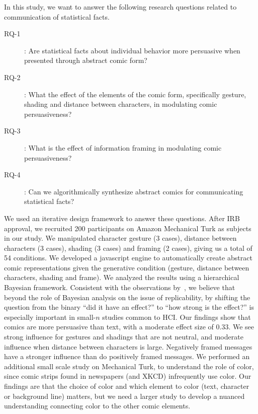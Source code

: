 

In this study, we want to answer the following research questions related to communication of statistical facts.

\begin{description}
 \item[RQ-1]: Are statistical facts about individual behavior more persuasive when presented through abstract comic form?
 \item [RQ-2]: What the effect of the elements of the comic form, specifically gesture, shading and distance between characters, in modulating comic persuasiveness?
 \item [RQ-3]: What is the effect of information framing in modulating comic persuasiveness?
 \item [RQ-4]: Can we algorithmically synthesize abstract comics for communicating statistical facts?
\end{description}

We used an iterative design framework to answer these questions. After IRB approval, we recruited 200 participants on Amazon Mechanical Turk as subjects in our study. We manipulated character gesture (3 cases), distance between characters (3 cases), shading (3 cases) and framing (2 cases), giving us a total of 54 conditions. We developed a javascript engine to automatically create abstract comic representations given the generative condition (gesture, distance between characters, shading and frame). We analyzed the results using a hierarchical Bayesian framework. Consistent with the observations by~\textcite{Kay2016}, we believe that beyond the role of Bayesian analysis on the issue of replicability, by shifting the question from the binary ``did it have an effect?'' to ``how strong is the effect?'' is especially important in small-$n$ studies common to HCI. Our findings show that comics are more persuasive than text, with a moderate effect size of 0.33. We see strong influence for gestures and shadings that are not neutral, and moderate influence when distance between characters is large. Negatively framed messages have a stronger influence than do positively framed messages. We performed an additional small scale study on Mechanical Turk, to understand the role of color, since comic strips found in newspapers (and XKCD) infrequently use color. Our findings are that the choice of color and which element to color (text, character or background line) matters, but we need a larger study to develop a nuanced understanding connecting color to the other comic elements.

